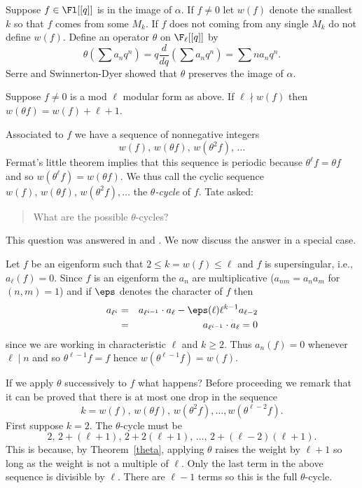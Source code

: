 \documentclass{report}
\begin{document}
Suppose $f\in\Fl[[q]]$ is in the image of $\alpha$.
If $f\neq  0$ let $w(f)$ denote the smallest $k$ so that $f$
comes from some $M_k$. If $f$ does not coming
from any single $M_k$ do not define $w(f)$.
Define an operator $\theta$ on $\F_\ell[[q]]$ by
$$\theta(\sum a_n q^n)=q\frac{d}{dq}(\sum a_n q^n)=\sum n a_n q^n.$$
Serre and Swinnerton-Dyer showed that $\theta$
preserves the image of $\alpha$.
\begin{theorem}\label{theta}
Suppose $f\neq 0$ is a mod $\ell$ modular form as above. If
$\ell \nmid w(f)$
then $w(\theta f)=w(f)+\ell+1$.
\end{theorem}
Associated to $f$ we have a sequence of nonnegative integers
$$w(f),\, w(\theta f),\, w(\theta^2 f),\, \ldots$$
Fermat's little theorem implies that this sequence
is periodic because $\theta^\ell f=\theta f$
and so $w(\theta^{\ell} f) = w(\theta f)$.
We thus call the cyclic sequence
  $w( f), \, w(\theta f), \, w(\theta^2 f), \ldots$
the {\em $\theta$-cycle} of $f$.
Tate asked:
\begin{quote}
     What are the possible $\theta$-cycles?
\end{quote}
This question was answered in \cite{jochnowitz:local}
and \cite{edixhoven:weight}.
We now discuss the answer in a special case.

Let $f$ be an eigenform such that $2\leq k=w(f) \leq \ell$
and $f$ is supersingular, i.e.,  $a_\ell(f)=0$.
Since $f$ is an eigenform
the $a_n$ are multiplicative
($a_{nm}=a_n a_m$ for $(n,m)=1$) and
if $\eps$ denotes the character of $f$ then
\begin{eqnarray*}
a_{\ell^i}
   &=& a_{\ell^{i-1}}\cdot a_{\ell} - \eps(\ell)\ell^{k-1} a_{\ell-2}\\
   &=& a_{\ell^{i-1}}\cdot a_{\ell} = 0
\end{eqnarray*}
since we are working in characteristic $\ell$ and $k\geq 2$.
Thus $a_n(f)=0$ whenever $\ell\mid{}n$ and so
$\theta^{\ell-1}f=f$ hence $w(\theta^{\ell-1}f)=w(f)$.

If we apply $\theta$ successively to $f$ what happens?
Before proceeding we remark that
it can be proved that there is at most
one drop in the sequence
  $$k=w( f), \, w(\theta f), \, w(\theta^2 f), \ldots, w(\theta^{\ell-2}f).$$
First suppose $k=2$.  The $\theta$-cycle must be
$$2,\, 2+(\ell+1),\, 2+2(\ell+1),\, \ldots,\, 2+(\ell-2)(\ell+1).$$
This is because, by Theorem~\ref{theta}, applying
$\theta$ raises the weight by $\ell+1$ so long
as the weight is not a multiple of $\ell$.
Only the last term in the above sequence is divisible by
$\ell$. There are $\ell-1$ terms so this is the
full $\theta$-cycle.
\end{document}
